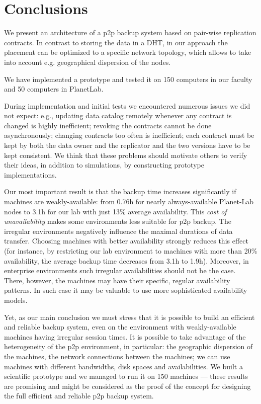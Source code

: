 \documentclass[10pt, final, conference, letterpaper]{IEEEtran}
\begin{document}
\section{Conclusions}
We present an architecture of a p2p backup system based on pair-wise replication contracts. 
In contrast to storing the data in a DHT, in our approach the placement can be optimized to a specific network topology, which allows to take into account e.g. geographical dispersion of the nodes.

We have implemented a prototype and tested it on 150 computers in our faculty and 50 computers in PlanetLab. 


During implementation and initial tests we encountered numerous issues we did not expect: e.g., updating data catalog remotely whenever any contract is changed is highly inefficient; revoking the contracts cannot be done asynchronously; changing contracts too often is inefficient; each contract must be kept by both the data owner and the replicator and the two versions have to be kept consistent. We think that these problems should motivate others to verify their ideas, in addition to simulations, by constructing prototype implementations.

Our most important result is that the backup time increases significantly if machines are weakly-available: from 0.76h for nearly always-available Planet-Lab nodes to 3.1h for our lab with just 13\% average availability. This \emph{cost of unavailability} makes some environments less suitable for p2p backup. The irregular environments negatively influence the maximal durations of data transfer. Choosing machines with better availability strongly reduces this effect (for instance, by restricting our lab environment to machines with more than 20\% availability, the average backup time decreases from 3.1h to 1.9h). Moreover, in enterprise environments such irregular availabilities should not be the case. There, however, the machines may have their specific, regular availability patterns. In such case it may be valuable to use more sophisticated availability models.

Yet, as our main conclusion we must stress that it is possible to build an efficient and reliable backup system, even on the environment with weakly-available machines having irregular session times.
It is possible to take advantage of the heterogeneity of the p2p environment, in particular: the geographic dispersion of the machines, the network connections between the machines; we can use machines with different bandwidths, disk spaces and availabilities. We built a scientific prototype and we managed to run it on 150 machines --- these results are promising and might be considered as the proof of the concept for designing the full efficient and reliable p2p backup system.



\end{document}

